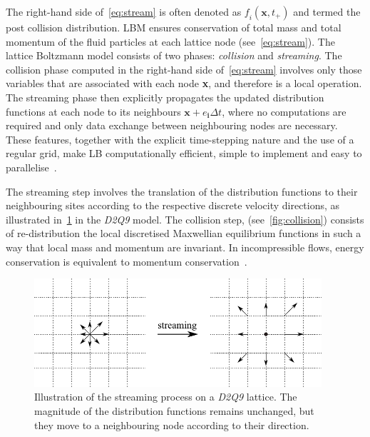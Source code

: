 The right-hand side of~\cref{eq:stream} is often denoted as 
$\mathit{f_i}(\mathbf{x}, \mathit{t}_{+})$ and termed the post collision 
distribution. LBM ensures conservation of total mass and total momentum of the 
fluid particles at each lattice node (see~\cref{eq:stream}). The lattice 
Boltzmann model consists of two phases: \textit{collision} and 
\textit{streaming}. The 
collision phase computed in the right-hand side of~\cref{eq:stream} involves 
only those variables that are associated with each node \textbf{x}, and 
therefore is a local operation. The streaming phase then explicitly propagates 
the updated distribution functions at each node to its neighbours 
$\mathbf{x}+\mathbf{\mathit{e}_i} \Delta t$, where no computations are required 
and only data exchange between neighbouring nodes are necessary. These 
features, together with the explicit time-stepping nature and the use of a 
regular grid, make LB computationally efficient, simple to implement and 
easy to parallelise~\citep{Han2007a}. 

The streaming step involves the translation of the distribution functions to 
their neighbouring sites according to the respective discrete velocity 
directions, as illustrated in~\cref{fig:stream} in the \textit{D2Q9} model. The 
collision step, (see~\cref{fig:collision}) consists of re-distribution the 
local discretised Maxwellian equilibrium functions in such a way that 
local mass and momentum are invariant. In incompressible flows, energy 
conservation is equivalent to momentum conservation~\citep{He1997}.

\begin{figure}[htbp]
	\centering
	\includegraphics[width=0.95\textwidth]{stream}
	\caption[Illustration of the streaming process on a \textit{D2Q9} 
	lattice.]{Illustration of the streaming process on a \textit{D2Q9} lattice. 
	The magnitude of the distribution functions remains unchanged, but they 
	move to a neighbouring node according to their direction.}
	\label{fig:stream}
\end{figure}

